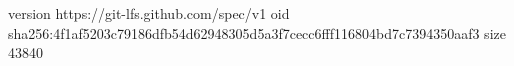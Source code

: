 version https://git-lfs.github.com/spec/v1
oid sha256:4f1af5203c79186dfb54d62948305d5a3f7cecc6fff116804bd7c7394350aaf3
size 43840
